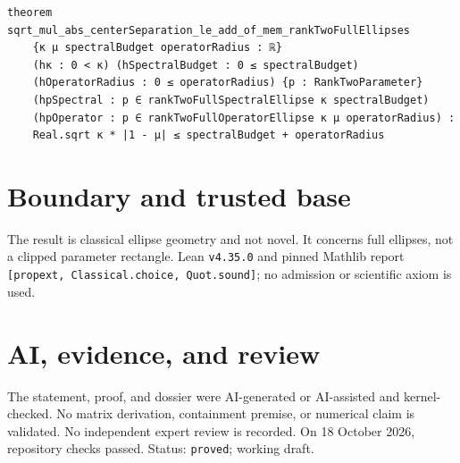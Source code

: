 \documentclass[11pt]{article}
\begin{document}
\begin{lstlisting}
theorem sqrt_mul_abs_centerSeparation_le_add_of_mem_rankTwoFullEllipses
    {κ μ spectralBudget operatorRadius : ℝ}
    (hκ : 0 < κ) (hSpectralBudget : 0 ≤ spectralBudget)
    (hOperatorRadius : 0 ≤ operatorRadius) {p : RankTwoParameter}
    (hpSpectral : p ∈ rankTwoFullSpectralEllipse κ spectralBudget)
    (hpOperator : p ∈ rankTwoFullOperatorEllipse κ μ operatorRadius) :
    Real.sqrt κ * |1 - μ| ≤ spectralBudget + operatorRadius
\end{lstlisting}

\section{Boundary and trusted base}
The result is classical ellipse geometry and not novel. It concerns full ellipses, not a
clipped parameter rectangle. Lean \texttt{v4.35.0} and pinned Mathlib report
\texttt{[propext, Classical.choice, Quot.sound]}; no admission or scientific axiom is used.

\section{AI, evidence, and review}
The statement, proof, and dossier were AI-generated or AI-assisted and kernel-checked.
No matrix derivation, containment premise, or numerical claim is validated. No
independent expert review is recorded. On 18 October 2026, repository checks passed.
Status: \texttt{proved}; working draft.
\end{document}
